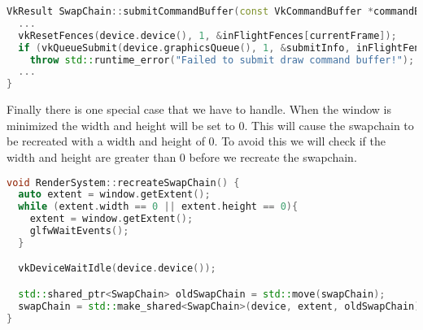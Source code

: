 \documentclass[12pt]{report} \usepackage{preamble}
\begin{document}
\begin{lstlisting}[language=C++]
VkResult SwapChain::submitCommandBuffer(const VkCommandBuffer *commandBuffer, uint32_t *imageIndex) {
  ...
  vkResetFences(device.device(), 1, &inFlightFences[currentFrame]);
  if (vkQueueSubmit(device.graphicsQueue(), 1, &submitInfo, inFlightFences[currentFrame]) != VK_SUCCESS)
    throw std::runtime_error("Failed to submit draw command buffer!");
  ...
}
\end{lstlisting}

Finally there is one special case that we have to handle. When the window is minimized the width and height will be set to 0. This will cause the swapchain to be recreated with a width and height of 0.
To avoid this we will check if the width and height are greater than 0 before we recreate the swapchain.

\begin{lstlisting}[language=C++]
void RenderSystem::recreateSwapChain() {
  auto extent = window.getExtent();
  while (extent.width == 0 || extent.height == 0){
    extent = window.getExtent();
    glfwWaitEvents();
  }

  vkDeviceWaitIdle(device.device());

  std::shared_ptr<SwapChain> oldSwapChain = std::move(swapChain);
  swapChain = std::make_shared<SwapChain>(device, extent, oldSwapChain);
}
\end{lstlisting}

\listoffigures

\printbibliography[
	heading=bibintoc, title={Bibliography}
]
\end{document}
